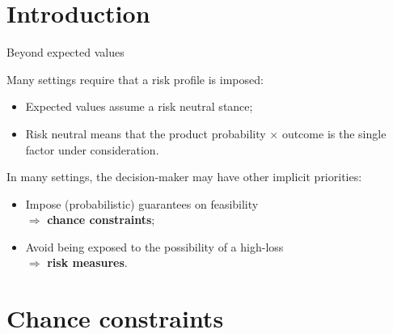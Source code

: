 \section{Introduction}

\begin{frame}{Beyond expected values}

	Many settings require that a \alert{risk profile} is imposed:
	\begin{itemize}
		\item Expected values assume a \alert{risk neutral} stance;
		\item Risk neutral means that the product \alert{probability $\times$ outcome} is the single factor under consideration.	
	\end{itemize}
	
	\pause
	In many settings, the decision-maker may have other implicit priorities:
		\begin{itemize}
			\item Impose (probabilistic) guarantees on \alert{feasibility} \\ $ \Rightarrow$ {\bf chance constraints};
			\item Avoid being exposed to the possibility of a \alert{high-loss} \\ $\Rightarrow$ {\bf risk measures}.	
		\end{itemize}
 
\end{frame}


\section{Chance constraints}


